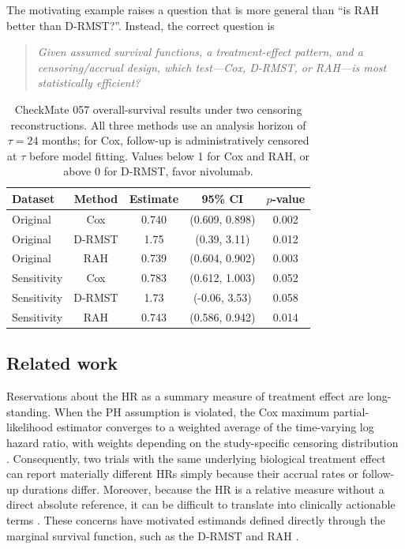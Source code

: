 \documentclass[12pt]{article}
\begin{document}
The motivating example raises a question that is more general than
``is RAH better than D-RMST?''. Instead, the correct question is

\begin{quote}
\emph{Given assumed survival functions, a treatment-effect pattern, and
a censoring/accrual design, which test---Cox, D-RMST, or RAH---is most
statistically efficient?}
\end{quote}




\begin{table}[ht]
\centering
\caption{CheckMate 057 overall-survival results under two censoring reconstructions. All three methods use an analysis horizon of $\tau=24$ months; for Cox, follow-up is administratively censored at $\tau$ before model fitting. Values below 1 for Cox and RAH, or above 0 for D-RMST, favor nivolumab.}
\label{tab:results-cm057-intro}
\begin{tabular}{lcccc}
\toprule
Dataset & Method & Estimate & 95\% CI & $p$-value
\\
\midrule
Original & Cox & 0.740 & (0.609, 0.898) & 0.002 \\
Original & D-RMST & 1.75 & (0.39, 3.11) & 0.012 \\
Original & RAH & 0.739 & (0.604, 0.902) & 0.003 \\
Sensitivity & Cox & 0.783 & (0.612, 1.003) & 0.052 \\
Sensitivity & D-RMST & 1.73 & (-0.06, 3.53) & 0.058 \\
Sensitivity & RAH & 0.743 & (0.586, 0.942) & 0.014 \\
\bottomrule
\end{tabular}
\end{table}


\subsection{Related work}
\label{sec:related}

Reservations about the HR as a summary measure of treatment effect are long-standing. When the PH assumption is violated, the Cox maximum partial-likelihood estimator converges to a weighted average of the time-varying log hazard ratio, with weights depending on the study-specific censoring distribution \citep{Cox1972,Hernan2010,Horiguchi2019}. Consequently, two trials with the same underlying biological treatment effect can report materially different HRs simply because their accrual rates or follow-up durations differ. Moreover, because the HR is a relative measure without a direct absolute reference, it can be difficult to translate into clinically actionable terms \citep{Uno2014}. These concerns have motivated estimands defined directly through the marginal survival function, such as the D-RMST \citep{Royston2013,Uno2014,Tian2014,survRM2} and RAH \citep{Uno2023,meng2026efficient}.
\end{document}
